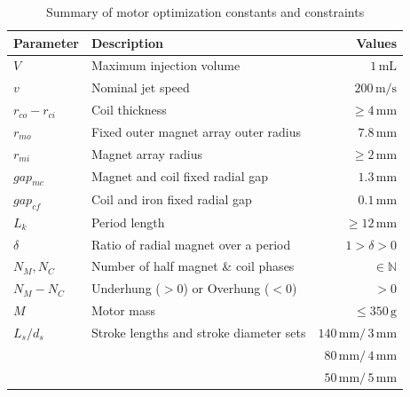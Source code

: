     \begin{table}[h]
        \renewcommand{\arraystretch}{1.2}
        \caption{Summary of motor optimization constants and constraints}
        \label{table:chap/experiment/table of optimization value ranges}
        \centering
        \begin{tabular}{llr}
        \hline
        \bfseries Parameter & \bfseries Description & \bfseries Values\\
        \hline
        	$V$ 			& Maximum injection volume 				&	$1\,\mathrm{mL}$\\
            $v$				& Nominal jet speed						&	$200\,\mathrm{m/s}$\\
            $r_{co}-r_{ci}$	& Coil thickness 						&	$\geq4\,\mathrm{mm}$\\ 
            $r_{mo}$		& Fixed outer magnet array outer radius &	$7.8\,\mathrm{mm}$\\
            $r_{mi}$		& Magnet array radius 					&	$\geq2\,\mathrm{mm}$\\ 
            $gap_{mc}$		& Magnet and coil fixed radial gap 		&	$1.3\,\mathrm{mm}$\\ 
            $gap_{cf}$		& Coil and iron fixed radial gap 		&	$0.1\,\mathrm{mm}$\\ 
            $L_k$			& Period length	 						&	$\geq12\,\mathrm{mm}$\\
            $\delta$		& Ratio of radial magnet over a period	& 	$1> \delta >0$\\
        \hline
        	$N_M,N_C$		& Number of half magnet \& coil phases	&	$\in\mathbb{N}$\\ 
            $N_M-N_C$		& Underhung ($>0$) or Overhung ($<0$)	&	$>0$\\ 
            $M$				& Motor mass							&	$\leq350\,\mathrm{g}$\\ 
            $L_s/d_s$		& Stroke lengths and stroke diameter sets		&	$140\,\mathrm{mm}/\,3\,\mathrm{mm}$\\ 
            				& 										& 	$80\,\mathrm{mm}/\,4\,\mathrm{mm}$\\
                        	& 										& 	$50\,\mathrm{mm}/\,5\,\mathrm{mm}$\\
        \hline
        \end{tabular}
    \end{table}
    
